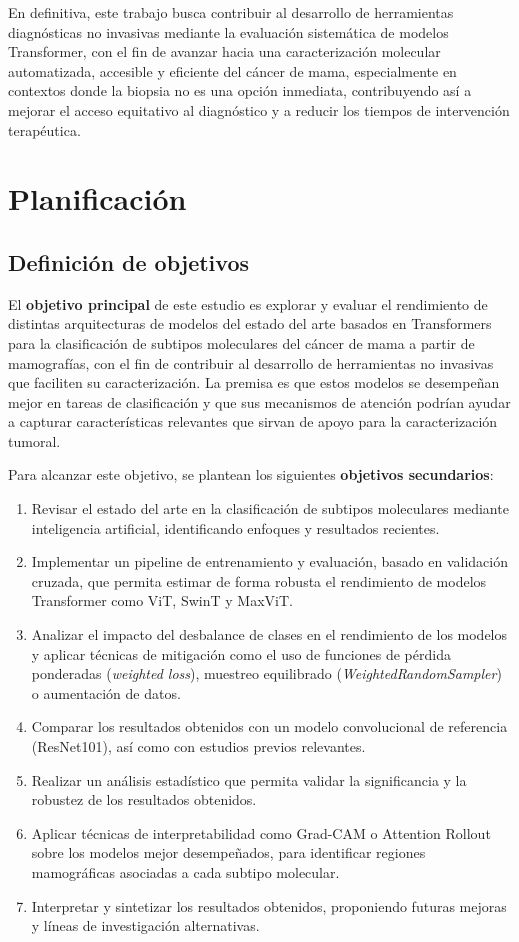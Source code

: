 \documentclass[a4paper,10pt]{book}
\begin{document}
En definitiva, este trabajo busca contribuir al desarrollo de herramientas diagnósticas no invasivas mediante la evaluación sistemática de modelos Transformer, con el fin de avanzar hacia una caracterización molecular automatizada, accesible y eficiente del cáncer de mama, especialmente en contextos donde la biopsia no es una opción inmediata, contribuyendo así a mejorar el acceso equitativo al diagnóstico y a reducir los tiempos de intervención terapéutica.

\section{Planificación}

\subsection{Definición de objetivos}

El \textbf{objetivo principal} de este estudio es explorar y evaluar el rendimiento de distintas arquitecturas de modelos del estado del arte basados en Transformers para la clasificación de subtipos moleculares del cáncer de mama a partir de mamografías, con el fin de contribuir al desarrollo de herramientas no invasivas que faciliten su caracterización. La premisa es que estos modelos se desempeñan mejor en tareas de clasificación y que sus mecanismos de atención podrían ayudar a capturar características relevantes que sirvan de apoyo para la caracterización tumoral.

Para alcanzar este objetivo, se plantean los siguientes \textbf{objetivos secundarios}:

\begin{enumerate}
	\item Revisar el estado del arte en la clasificación de subtipos moleculares mediante inteligencia artificial, identificando enfoques y resultados recientes.
	\item Implementar un pipeline de entrenamiento y evaluación, basado en validación cruzada, que permita estimar de forma robusta el rendimiento de modelos Transformer como ViT, SwinT y MaxViT.
	\item Analizar el impacto del desbalance de clases en el rendimiento de los modelos y aplicar técnicas de mitigación como el uso de funciones de pérdida ponderadas (\textit{weighted loss}), muestreo equilibrado (\textit{WeightedRandomSampler}) o aumentación de datos.
	\item Comparar los resultados obtenidos con un modelo convolucional de referencia (ResNet101), así como con estudios previos relevantes.
	\item Realizar un análisis estadístico que permita validar la significancia y la robustez de los resultados obtenidos.
	\item Aplicar técnicas de interpretabilidad como Grad-CAM o Attention Rollout sobre los modelos mejor desempeñados, para identificar regiones mamográficas asociadas a cada subtipo molecular.
	\item Interpretar y sintetizar los resultados obtenidos, proponiendo futuras mejoras y líneas de investigación alternativas.
\end{enumerate}
\end{document}

